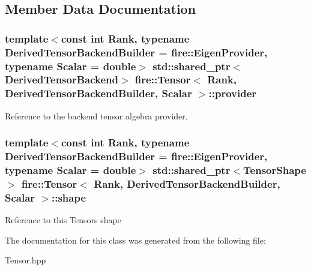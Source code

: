 \subsection{Member Data Documentation}
\hypertarget{a00046_adffb886fa5e4d9f0ffcb980af3173bd4}{}
\subsubsection[{provider}]{\setlength{\rightskip}{0pt plus 5cm}template$<$const int Rank, typename Derived\+Tensor\+Backend\+Builder = fire\+::\+Eigen\+Provider, typename Scalar = double$>$ std\+::shared\+\_\+ptr$<${\bf Derived\+Tensor\+Backend}$>$ {\bf fire\+::\+Tensor}$<$ Rank, Derived\+Tensor\+Backend\+Builder, Scalar $>$\+::provider\hspace{0.3cm}{\ttfamily [protected]}}\label{a00046_adffb886fa5e4d9f0ffcb980af3173bd4}
Reference to the backend tensor algebra provider. \hypertarget{a00046_ab35d7a07696ced19cb5f0cebb6406ce4}{}
\subsubsection[{shape}]{\setlength{\rightskip}{0pt plus 5cm}template$<$const int Rank, typename Derived\+Tensor\+Backend\+Builder = fire\+::\+Eigen\+Provider, typename Scalar = double$>$ std\+::shared\+\_\+ptr$<${\bf Tensor\+Shape}$>$ {\bf fire\+::\+Tensor}$<$ Rank, Derived\+Tensor\+Backend\+Builder, Scalar $>$\+::shape\hspace{0.3cm}{\ttfamily [protected]}}\label{a00046_ab35d7a07696ced19cb5f0cebb6406ce4}
Reference to this Tensors shape 

The documentation for this class was generated from the following file\+:\begin{DoxyCompactItemize}
\item 
Tensor.\+hpp\end{DoxyCompactItemize}
